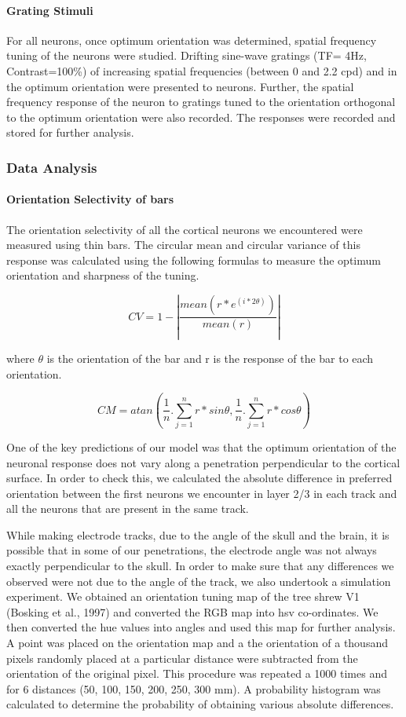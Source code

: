 \paragraph{Grating Stimuli}
For all neurons, once optimum orientation was determined, spatial frequency tuning of the neurons were studied. Drifting sine-wave gratings (TF= 4Hz, Contrast=100\%) of increasing spatial frequencies (between 0 and 2.2 cpd) and in the optimum orientation were presented to neurons. Further, the spatial frequency response of the neuron to gratings tuned to the orientation orthogonal to the optimum orientation were also recorded. The responses were recorded and stored for further analysis.

\subsubsection{Data Analysis}

\paragraph{Orientation Selectivity of bars}

The orientation selectivity of all the cortical neurons we encountered were measured using thin bars. The circular mean and circular variance of this response was calculated using the following formulas to measure the optimum orientation and sharpness of the tuning.

\[CV=1-|\frac{mean(r*e^{(i*2\theta)})}{mean(r)}|\]

where $\theta$ is the orientation of the bar and r is the response of the bar to each orientation.

\[CM=atan(\frac{1}{n}.\sum_{j=1}^{n}r*sin\theta, \frac{1}{n}.\sum_{j=1}^{n}r*cos\theta)\]


One of the key predictions of our model was that the optimum orientation of the neuronal response does not vary along a penetration perpendicular to the cortical surface. In order to check this, we calculated the absolute difference in preferred orientation between the first neurons we encounter in layer 2/3 in each track and all the neurons that are present in the same track.

While making electrode tracks, due to the angle of the skull and the brain, it is possible that in some of our penetrations, the electrode angle was not always exactly perpendicular to the skull. In order to make sure that any differences we observed were not due to the angle of the track, we also undertook a simulation experiment. We obtained an orientation tuning map of the tree shrew V1 (Bosking et al., 1997) and converted the RGB map into hsv co-ordinates. We then converted the hue values into angles and used this map for further analysis. A point was placed on the orientation map and a the orientation of a thousand pixels randomly placed at a particular distance were subtracted from the orientation of the original pixel. This procedure was repeated a 1000 times and for 6 distances (50, 100, 150, 200, 250, 300 mm). A probability histogram was calculated to determine the probability of obtaining various absolute differences.

